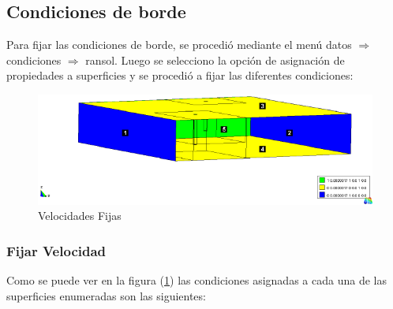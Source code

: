 \documentclass[10pt,a4paper,final]{article}
\begin{document}
\subsection{Condiciones de borde}
Para fijar las condiciones de borde, se procedió mediante el menú datos $\Rightarrow$ condiciones $\Rightarrow$ ransol. Luego se selecciono la opción de asignación de propiedades a superficies y se procedió a fijar las diferentes condiciones:
\begin{figure}[tbhp]
\centerline{\includegraphics[scale=0.75]{img/datos_condiciones_ransol_fijar_velocidadinterno_leyendas}}
\caption{Velocidades Fijas}
\label{datos_condiciones_ransol_fijar_velocidadinterno_leyendas}
\end{figure}
\subsubsection*{Fijar Velocidad}
Como se puede ver en la figura (\ref{datos_condiciones_ransol_fijar_velocidadinterno_leyendas}) las condiciones asignadas a cada una de las superficies enumeradas son las siguientes:
\end{document}
